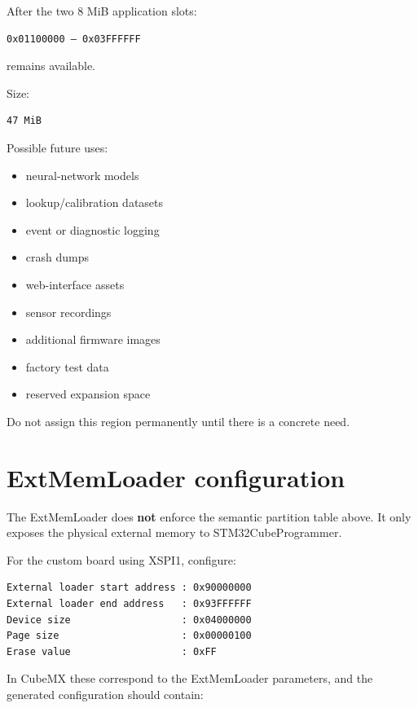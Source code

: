 \documentclass[10pt,a4paper,oneside]{report}
\providecommand{\tightlist}{\setlength{\itemsep}{1pt}\setlength{\parskip}{1pt}}
\begin{document}
After the two 8 MiB application slots:

\begin{verbatim}
0x01100000 – 0x03FFFFFF
\end{verbatim}

remains available.

Size:

\begin{verbatim}
47 MiB
\end{verbatim}

Possible future uses:

\begin{itemize}
\tightlist
\item
  neural-network models
\item
  lookup/calibration datasets
\item
  event or diagnostic logging
\item
  crash dumps
\item
  web-interface assets
\item
  sensor recordings
\item
  additional firmware images
\item
  factory test data
\item
  reserved expansion space
\end{itemize}

Do not assign this region permanently until there is a concrete need.

\section{ExtMemLoader configuration}\label{wiki-reference-flash-layout-proposal--9-extmemloader-configuration}

The ExtMemLoader does \textbf{not} enforce the semantic partition table above. It only exposes the physical external memory to STM32CubeProgrammer.

For the custom board using XSPI1, configure:

\begin{verbatim}
External loader start address : 0x90000000
External loader end address   : 0x93FFFFFF
Device size                   : 0x04000000
Page size                     : 0x00000100
Erase value                   : 0xFF
\end{verbatim}

In CubeMX these correspond to the ExtMemLoader parameters, and the generated configuration should contain:
\end{document}
